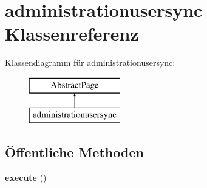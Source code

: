 \hypertarget{classadministrationusersync}{}\section{administrationusersync Klassenreferenz}
\label{classadministrationusersync}
Klassendiagramm für administrationusersync\+:\begin{figure}[H]
\begin{center}
\leavevmode
\includegraphics[height=2.000000cm]{classadministrationusersync}
\end{center}
\end{figure}
\subsection*{Öffentliche Methoden}
\begin{DoxyCompactItemize}
\item 
\mbox{\label{classadministrationusersync_a6c3db98730e5101ddff1d6e1bb490e89}} 
{\bfseries execute} ()
\end{DoxyCompactItemize}
